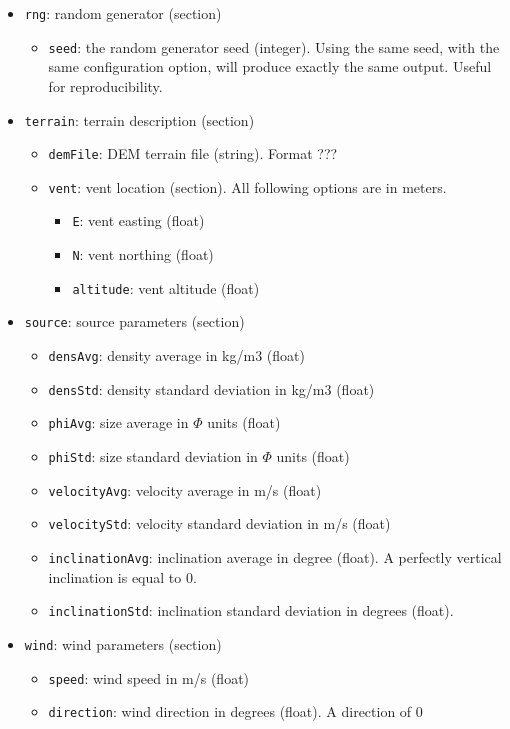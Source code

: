 \documentclass[10pt,a4paper]{article}
\begin{document}
\begin{itemize}
\item \texttt{rng}: random generator (section)
\begin{itemize}
\item \texttt{seed}: the random generator seed (integer). Using the same seed,
with the same configuration option, will produce exactly the same
output. Useful for reproducibility.
\end{itemize}
\item \texttt{terrain}: terrain description (section)
\begin{itemize}
\item \texttt{demFile}: DEM terrain file (string). Format ???
\item \texttt{vent}: vent location (section). All following options are in meters.
\begin{itemize}
\item \texttt{E}: vent easting (float)
\item \texttt{N}: vent northing (float)
\item \texttt{altitude}: vent altitude (float)
\end{itemize}
\end{itemize}
\item \texttt{source}: source parameters (section)
\begin{itemize}
\item \texttt{densAvg}: density average in kg/m3 (float)
\item \texttt{densStd}: density standard deviation in kg/m3 (float)
\item \texttt{phiAvg}: size average in $\Phi$ units (float)
\item \texttt{phiStd}: size standard deviation in $\Phi$ units (float)
\item \texttt{velocityAvg}: velocity average in m/s (float)
\item \texttt{velocityStd}: velocity standard deviation in m/s (float)
\item \texttt{inclinationAvg}: inclination average in degree (float). A perfectly vertical
inclination is equal to 0.
\item \texttt{inclinationStd}: inclination standard deviation in degrees (float).
\end{itemize}
\item \texttt{wind}: wind parameters (section)
\begin{itemize}
\item \texttt{speed}: wind speed in m/s (float)
\item \texttt{direction}: wind direction in degrees (float). A direction of 0

\end{itemize}
\end{itemize}
\end{document}
